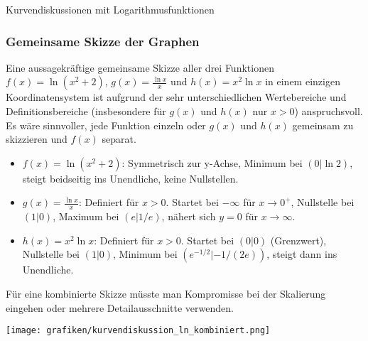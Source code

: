 \begin{loesungsumgebung}{Kurvendiskussionen mit Logarithmusfunktionen}
\subsubsection*{Gemeinsame Skizze der Graphen}
Eine aussagekräftige gemeinsame Skizze aller drei Funktionen $f(x)=\ln(x^2+2)$, $g(x)=\frac{\ln x}{x}$ und $h(x)=x^2\ln x$ in einem einzigen Koordinatensystem ist aufgrund der sehr unterschiedlichen Wertebereiche und Definitionsbereiche (insbesondere für $g(x)$ und $h(x)$ nur $x>0$) anspruchsvoll. Es wäre sinnvoller, jede Funktion einzeln oder $g(x)$ und $h(x)$ gemeinsam zu skizzieren und $f(x)$ separat.
\begin{itemize}
    \item $f(x)=\ln(x^2+2)$: Symmetrisch zur y-Achse, Minimum bei $(0|\ln 2)$, steigt beidseitig ins Unendliche, keine Nullstellen.
    \item $g(x)=\frac{\ln x}{x}$: Definiert für $x>0$. Startet bei $-\infty$ für $x \to 0^+$, Nullstelle bei $(1|0)$, Maximum bei $(e|1/e)$, nähert sich $y=0$ für $x \to \infty$.
    \item $h(x)=x^2\ln x$: Definiert für $x>0$. Startet bei $(0|0)$ (Grenzwert), Nullstelle bei $(1|0)$, Minimum bei $(e^{-1/2}|-1/(2e))$, steigt dann ins Unendliche.
\end{itemize}
Für eine kombinierte Skizze müsste man Kompromisse bei der Skalierung eingehen oder mehrere Detailausschnitte verwenden.

\begin{center}
\texttt{[image: grafiken/kurvendiskussion\_ln\_kombiniert.png]}
\label{fig:kurvendiskussion_ln_kombiniert}
\end{center}

\end{loesungsumgebung}



